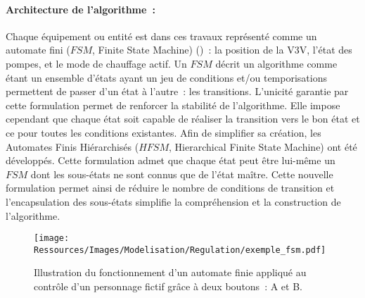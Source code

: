 \paragraph{Architecture de l’algorithme~:} %
\label{par:architecture_de_l_algorithme}
Chaque équipement ou entité est dans ces travaux représenté comme un automate fini ($FSM$,
Finite State Machine) ()~: la position de la V3V, l’état des
pompes, et le mode de chauffage actif. Un $FSM$ décrit un algorithme comme étant un
ensemble d’états ayant un jeu de conditions et/ou temporisations permettent de passer d’un
état à l’autre~: les transitions. L’unicité garantie par cette formulation permet de
renforcer la stabilité de l’algorithme. Elle impose cependant que chaque état soit capable
de réaliser la transition vers le bon état et ce pour toutes les conditions existantes.
Afin de simplifier sa création, les Automates Finis Hiérarchisés ($HFSM$, Hierarchical
Finite State Machine) ont été développés. Cette formulation admet que chaque état peut
être lui-même un $FSM$ dont les sous-états ne sont connus que de l’état maître. Cette
nouvelle formulation permet ainsi de réduire le nombre de conditions de transition et
l’encapsulation des sous-états simplifie la compréhension et la construction de
l’algorithme.

\begin{figure}
    \centering
    \texttt{[image: Ressources/Images/Modelisation/Regulation/exemple\_fsm.pdf]}
    \caption{Illustration du fonctionnement d’un automate finie appliqué au contrôle
             d’un personnage fictif grâce à deux boutons~: A et B.
             \label{fig:automate_fini}}
\end{figure}

